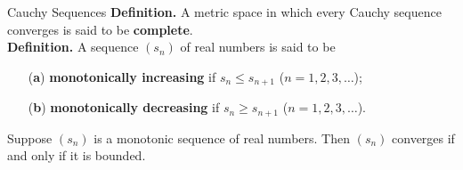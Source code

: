 \documentclass{beamer}
\begin{document}
\begin{frame}{Cauchy Sequences}
\textbf{Definition.} A metric space in which every Cauchy sequence converges is
said to be \textbf{complete}.\\

\textbf{Definition.} A sequence $(s_n)$ of real numbers is said to be
\begin{enumerate}
    \item[(\textbf{a})] \textbf{monotonically increasing} if $s_n \leq s_{n+1}$
    ($n = 1, 2, 3, \dotsc$);
    \item[(\textbf{b})] \textbf{monotonically decreasing} if $s_n \geq s_{n+1}$
    ($n = 1, 2, 3, \dotsc$).
\end{enumerate}

\begin{theorem}
Suppose $(s_n)$ is a monotonic sequence of real numbers. Then $(s_n)$ converges
if and only if it is bounded.
\end{theorem}
\end{frame}
\end{document}
